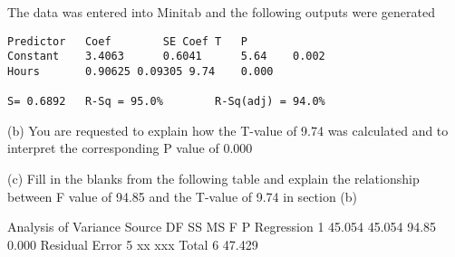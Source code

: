 The data was entered into Minitab and the following outputs were generated

\begin{verbatim}
Predictor	Coef		SE Coef	T	P
Constant	3.4063		0.6041		5.64	0.002
Hours		0.90625	0.09305	9.74	0.000

S= 0.6892	R-Sq = 95.0%		R-Sq(adj) = 94.0%
\end{verbatim}


(b) 	You are requested to explain how the T-value of 9.74 was calculated and to 
interpret the corresponding P value of 0.000


(c)	Fill in the blanks from the following table and explain the relationship between F value of 94.85 and the T-value of 9.74 in section (b)

Analysis of Variance
Source			DF		SS		MS		F		P
Regression		1		45.054		45.054		94.85		0.000
Residual Error		5		xx		xxx		
Total			6		47.429

















